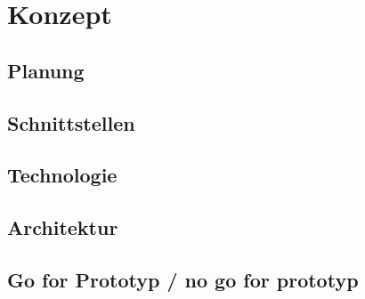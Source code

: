 \chapter{Konzept}
\label{sec:konzept}

\section{Planung}
\section{Schnittstellen}
\section{Technologie}
\section{Architektur}
\section{Go for Prototyp / no go for prototyp }
